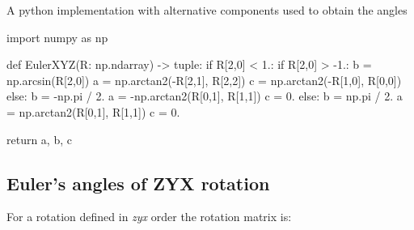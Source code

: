     A python implementation with alternative components used to obtain the angles

\begin{python}
import numpy as np

def EulerXYZ(R: np.ndarray) -> tuple:
    if R[2,0] < 1.:
        if R[2,0] > -1.:
            b = np.arcsin(R[2,0])
            a = np.arctan2(-R[2,1], R[2,2])
            c = np.arctan2(-R[1,0], R[0,0])
        else:
            b = -np.pi / 2.
            a = -np.arctan2(R[0,1], R[1,1])
            c = 0.
    else:
        b = np.pi / 2.
        a = np.arctan2(R[0,1], R[1,1])
        c = 0.

    return a, b, c
\end{python}


\subsection{Euler's angles of \textbf{ZYX} rotation}

    For a rotation defined in \textit{zyx} order the rotation matrix is:

